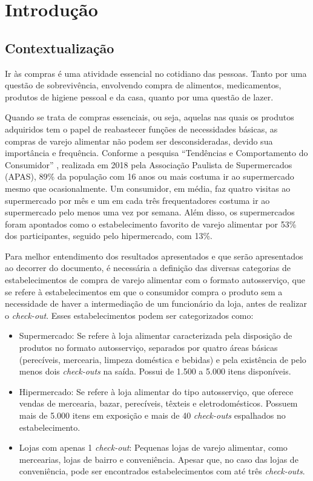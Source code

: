 \chapter{Introdução}

\label{sec:contextualizao}
\section{Contextualização}
Ir às compras é uma atividade essencial no cotidiano das pessoas. Tanto por uma questão de sobrevivência, envolvendo compra de alimentos, medicamentos, produtos de higiene pessoal e da casa, quanto por uma questão de lazer.

Quando se trata de compras essenciais, ou seja, aquelas nas quais os produtos adquiridos tem o papel de reabastecer funções de necessidades básicas, as compras de varejo alimentar não podem ser desconsideradas, devido sua importância e frequência. Conforme a pesquisa “Tendências e Comportamento do Consumidor” \cite{APAS}, realizada em 2018 pela Associação Paulista de Supermercados (APAS), 89\% da população com 16 anos ou mais costuma ir ao supermercado mesmo que ocasionalmente. Um consumidor, em média, faz quatro visitas ao supermercado por mês e um em cada três frequentadores costuma ir ao supermercado pelo menos uma vez por semana. Além disso, os supermercados foram apontados como o estabelecimento favorito de varejo alimentar por 53\% dos participantes, seguido pelo hipermercado, com 13\%.

Para melhor entendimento dos resultados apresentados e que serão apresentados ao decorrer do documento, é necessária a definição das diversas categorias de estabelecimentos de compra de varejo alimentar com o formato autosserviço, que se refere à estabelecimentos em que o consumidor compra o produto sem a necessidade de haver a intermediação de um funcionário da loja, antes de realizar o \textit{check-out}. Esses estabelecimentos podem ser categorizados como:
\begin{itemize}
\item Supermercado: Se refere à loja alimentar caracterizada pela disposição de produtos no formato autosserviço, separados por quatro áreas básicas (perecíveis, mercearia, limpeza doméstica e bebidas) e pela existência de pelo menos dois \textit{check-outs} na saída. Possui de 1.500 a 5.000 itens disponíveis.
\item Hipermercado: Se refere à loja alimentar do tipo autosserviço, que oferece vendas de mercearia, bazar, perecíveis, têxteis e eletrodomésticos. Possuem mais de 5.000 itens em exposição e mais de 40 \textit{check-outs} espalhados no estabelecimento.
\item Lojas com apenas 1 \textit{check-out}: Pequenas lojas de varejo alimentar, como mercearias, lojas de bairro e conveniência. Apesar que, no caso das lojas de conveniência, pode ser encontrados estabelecimentos com até três \textit{check-outs}.
\end{itemize}

